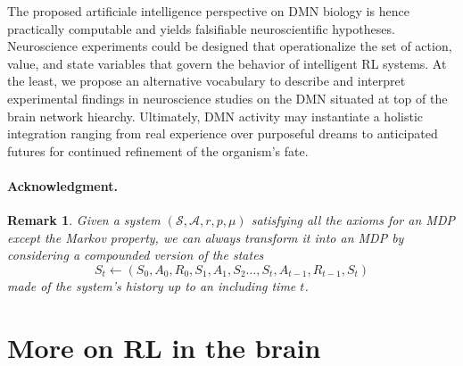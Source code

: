 \documentclass[10pt,letterpaper]{article}
\newtheorem{remark}{Remark}
\begin{document}
The proposed artificiale intelligence perspective
on DMN biology is hence practically computable and
yields falsifiable neuroscientific hypotheses.
%
Neuroscience experiments could be designed that operationalize
the set of action, value, and state variables that govern
the behavior of intelligent RL systems.
%
At the least, we propose an alternative vocabulary to
describe and interpret experimental findings in neuroscience studies
on the DMN situated at top of the brain network hiearchy.
%
Ultimately,
DMN activity may instantiate a holistic integration
ranging from real experience over purposeful dreams to anticipated futures
for continued refinement of the organism's fate.



\paragraph{Acknowledgment.}


\small
% 
% 



\appendix

\begin{remark}
  Given a system $(\mathcal S, \mathcal A, r, p, \mu)$ satisfying all the axioms for an MDP
  except the Markov property, we can always transform it into an MDP by considering a compounded
  version of the states
  $$S_t \leftarrow (S_0,A_0,R_0,S_1,A_1,S_2\ldots,S_t,A_{t-1},R_{t-1},S_{t})$$ made of the system's
  history up to an including time $t$.
\end{remark}

\section{More on RL in the brain}
\end{document}
